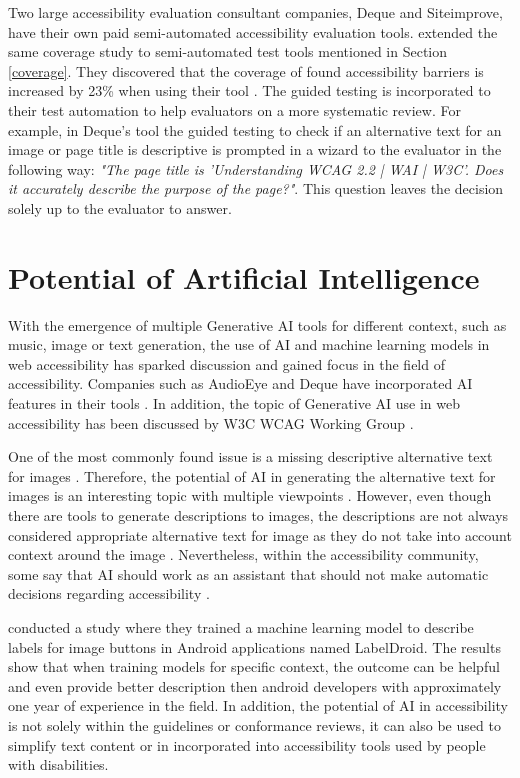 Two large accessibility evaluation consultant companies, Deque and Siteimprove, have their own paid semi-automated accessibility evaluation tools. \textcite{dequecoverage_semi} extended the same coverage study to semi-automated test tools mentioned in Section \ref{coverage}. They discovered that the coverage of found accessibility barriers is increased by 23\% when using their tool \citep{dequecoverage_semi}. The guided testing is incorporated to their test automation to help evaluators on a more systematic review. For example, in Deque's tool the guided testing to check if an alternative text for an image or page title is descriptive is prompted in a wizard to the evaluator in the following way: \textit{"The page title is 'Understanding WCAG 2.2 | WAI | W3C'. Does it accurately describe the purpose of the page?"}. This question leaves the decision solely up to the evaluator to answer.


\section{Potential of Artificial Intelligence}

With the emergence of multiple Generative AI tools for different context, such as music, image or text generation, the use of AI and machine learning models in web accessibility has sparked discussion and gained focus in the field of accessibility. Companies such as AudioEye and Deque have incorporated AI features in their tools \citep{deque_igt, boia_improve_accessibility}. In addition, the topic of Generative AI use in web accessibility has been discussed by W3C WCAG Working Group \citep{ai_wcag_email}. 

One of the most commonly found issue is a missing descriptive alternative text for images \citep{webaimmillions, dequecoverage}. Therefore, the potential of AI in generating the alternative text for images is an interesting topic with multiple viewpoints \citep{ai_wcag_email, boia_alt_text, potential_for_ai}. However, even though there are tools to generate descriptions to images, the descriptions are not always considered appropriate alternative text for image as they do not take into account context around the image \citep{accessibility_and_ai, boia_alt_text}. Nevertheless, within the accessibility community, some say that AI should work as an assistant that should not make automatic decisions regarding accessibility \citep{ai_wcag_email, accessibility_and_ai}.

\textcite{chen2020unblind} conducted a study where they trained a machine learning model to describe labels for image buttons in Android applications named LabelDroid. The results show that when training models for specific context, the outcome can be helpful and even provide better description then android developers with approximately one year of experience in the field. In addition, the potential of AI in accessibility is not solely within the guidelines or conformance reviews, it can also be used to simplify text content or in incorporated into accessibility tools used by people with disabilities.

